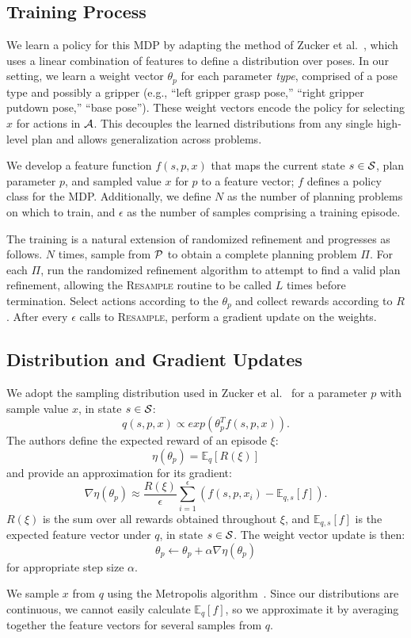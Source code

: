 \subsection{Training Process}
We learn a policy for this MDP by adapting the method of Zucker et al.~\cite{workspacebias}, which
uses a linear combination of features to define a distribution over poses. In our setting, we learn a weight
vector $\theta_{p}$ for each parameter \emph{type}, comprised of a pose type and possibly a gripper
(e.g., ``left gripper grasp pose,'' ``right gripper putdown pose,'' ``base pose'').
These weight vectors encode the policy for selecting $x$ for actions in $\mathcal{A}$.
This decouples the learned distributions from any single high-level plan and allows generalization across problems.

We develop a feature function $f(s, p, x)$ that maps the current
state $s \in \mathcal{S}$, plan parameter $p$, and sampled value $x$ for $p$ to a
feature vector; $f$ defines a policy class for the MDP. Additionally, we define
$N$ as the number of planning problems on which to train, and
$\epsilon$ as the number of samples comprising a training episode.

The training is a natural extension of randomized
refinement and progresses as follows. $N$ times, sample from $\mathcal{P}$ to obtain
a complete planning problem $\Pi$. For each $\Pi$, run the randomized refinement
algorithm to attempt to find a valid plan refinement, allowing the \textsc{Resample}
routine to be called $L$ times before termination. Select actions according to the $\theta_{p}$
and collect rewards according to $R$. After every $\epsilon$ calls to
\textsc{Resample}, perform a gradient update on the weights.

\subsection{Distribution and Gradient Updates}
We adopt the sampling distribution used in Zucker et al.~\cite{workspacebias}
for a parameter $p$ with sample value $x$, in state $s \in \mathcal{S}$:
$$q(s, p, x) \propto exp(\theta_{p}^{T} f(s, p, x)).$$
The authors define the expected reward of an episode $\xi$:
$$\eta(\theta_{p}) = \mathbb{E}_{q}[R(\xi)]$$ and provide an approximation for its gradient:
$$\nabla \eta(\theta_{p}) \approx \frac{R(\xi)}{\epsilon} \sum_{i=1}^{\epsilon}(f(s, p, x_{i}) - \mathbb{E}_{q,s}[f]).$$
$R(\xi)$ is the sum over all rewards obtained throughout $\xi$, and
$\mathbb{E}_{q,s}[f]$ is the expected feature vector under $q$, in state $s \in \mathcal{S}$. The weight vector update is then:
$$\theta_{p} \leftarrow \theta_{p} + \alpha \nabla \eta(\theta_{p})$$
for appropriate step size $\alpha$.

We sample $x$ from $q$ using the Metropolis algorithm~\cite{chib1995understanding}.
Since our distributions are continuous, we cannot easily calculate $\mathbb{E}_{q}[f]$,
so we approximate it by averaging together the feature vectors for several samples from $q$.